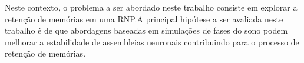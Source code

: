 Neste contexto, o problema a ser abordado neste trabalho consiste em explorar a retenção de memórias em uma RNP.\@ A principal
hipótese a ser avaliada neste trabalho é de que abordagens baseadas em simulações de fases do sono podem melhorar a estabilidade
de assembleias neuronais contribuindo para o processo de retenção de memórias.






